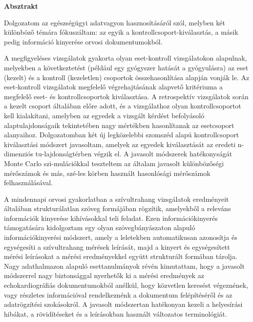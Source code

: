 \centerline{\Large{\textbf{Absztrakt}}}

\vspace{0.5cm}

\noindent Dolgozatom az egészségügyi adatvagyon hasznosításáról szól, melyben két különböző témára fókuszáltam: az egyik a kontrollcsoport-kiválasztás, a másik pedig információ kinyerése orvosi dokumentumokból. 

A megfigyeléses vizsgálatok gyakorta olyan eset-kontroll vizsgálatokon alapulnak, melyekben a következtetést (például egy gyógyszer hatását a gyógyulásra) az eset (kezelt) és a kontroll (kezeletlen) csoportok összehasonlítása alapján vonják le. Az eset-kontroll vizsgálatok megfelelő végrehajtásának alapvető kritériuma a megfelelő eset- és kontrollcsoportok kiválasztása. A retrospektív vizsgálatok során a kezelt csoport általában előre adott, és a vizsgálathoz olyan kontrollcsoportot kell kialakítani, amelyben az egyedek a vizsgált kérdést befolyásoló alaptulajdonságaik tekintetében nagy mértékben hasonlítanak az esetcsoport alanyaihoz. Dolgozatomban két új legközelebbi szomszéd alapú kontrollcsoport kiválasztási módszert javasoltam, amelyek az egyedek kiválasztását az eredeti n-dimenziós tu-lajdonságtérben végzik el. A javasolt módszerek hatékonyságát Monte Carlo szi-mulációkkal teszteltem az általam javasolt különbözőségi mérőszámok és más, szé-les körben használt hasonlósági mérőszámok felhasználásával. 

A mindennapi orvosi gyakorlatban a szívultrahang vizsgálatok eredményeit általában strukturálatlan szöveg formájában rögzítik, amelyekből a releváns információk kinyerése kihívásokkal teli feladat. Ezen információkinyerés támogatására kidolgoztam egy olyan szövegbányászaton alapuló információkinyerési módszert, amely a leletekben automatikusan azonosítja és egységesíti a szívultrahang mérések leírását, majd a kinyert és egységesített mérési leírásokat a mérési eredményekkel együtt strukturált formában tárolja. Nagy adathalmazon alapuló esettanulmányok révén kimutattam, hogy a javasolt módszerrel nagy biztonsággal nyerhetők ki a mérési eredmények az echokardiográfiás dokumentumokból anélkül, hogy közvetlen keresést végeznének, vagy részletes információval rendelkeznénk a dokumentum felépítéséről és az adatrögzítési szokásokról. A javasolt módszertan hatékonyan kezeli a helyesírási hibákat, a rövidítéseket és a leírásokban használt változatos terminológiát.